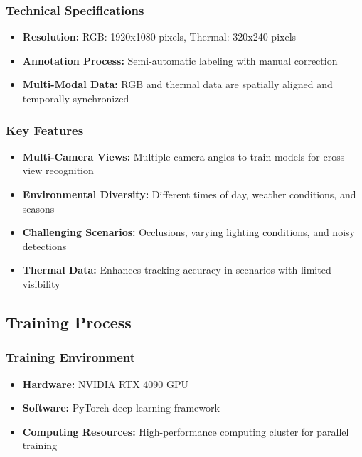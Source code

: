 \subsubsection{Technical Specifications}
\label{subsubsection:dataset-technical-specs}

\begin{itemize}
    \item \textbf{Resolution:} RGB: 1920x1080 pixels, Thermal: 320x240 pixels
    \item \textbf{Annotation Process:} Semi-automatic labeling with manual correction
    \item \textbf{Multi-Modal Data:} RGB and thermal data are spatially aligned and temporally synchronized
\end{itemize}

\subsubsection{Key Features}
\label{subsubsection:dataset-key-features}

\begin{itemize}
    \item \textbf{Multi-Camera Views:} Multiple camera angles to train models for cross-view recognition
    \item \textbf{Environmental Diversity:} Different times of day, weather conditions, and seasons
    \item \textbf{Challenging Scenarios:} Occlusions, varying lighting conditions, and noisy detections
    \item \textbf{Thermal Data:} Enhances tracking accuracy in scenarios with limited visibility
\end{itemize}

\subsection{Training Process}
\label{subsection:training-process}

\subsubsection{Training Environment}
\label{subsubsection:training-environment}

\begin{itemize}
    \item \textbf{Hardware:} NVIDIA RTX 4090 GPU
    \item \textbf{Software:} PyTorch deep learning framework
    \item \textbf{Computing Resources:} High-performance computing cluster for parallel training
\end{itemize}


